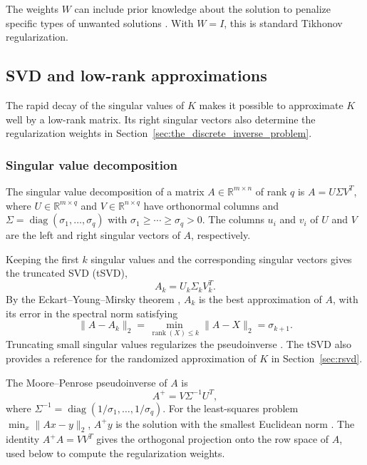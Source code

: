 The weights $W$ can include prior knowledge about the solution to penalize specific types of unwanted solutions \cite{hansen2010discrete}. With $W = I$, this is standard Tikhonov regularization.


\subsection{SVD and low-rank approximations}
The rapid decay of the singular values of $K$ makes it possible to approximate $K$ well by a low-rank matrix. Its right singular vectors also determine the regularization weights in Section~\ref{sec:the_discrete_inverse_problem}.

\subsubsection{Singular value decomposition}\label{sec:svd}
The singular value decomposition of a matrix $A\in\mathbb R^{m\times n}$ of rank $q$ is $A=U\Sigma V^T$, where $U\in\mathbb R^{m\times q}$ and $V\in\mathbb R^{n\times q}$ have orthonormal columns and $\Sigma=\operatorname{diag}(\sigma_1,\dots,\sigma_q)$ with $\sigma_1\ge\cdots\ge\sigma_q>0$. The columns $u_i$ and $v_i$ of $U$ and $V$ are the left and right singular vectors of $A$, respectively.

Keeping the first $k$ singular values and the corresponding singular vectors gives the truncated SVD (tSVD),
\begin{equation}\label{eq:tsvd}
    A_k = U_k\Sigma_k V_k^T.
\end{equation}
By the Eckart--Young--Mirsky theorem \cite{eckartApproximationOneMatrix1936}, $A_k$ is the best approximation of $A$, with its error in the spectral norm satisfying
\begin{equation}\label{eq:svd_error}
    \|A-A_k\|_2 = \min_{\operatorname{rank}(X)\le k}\|A-X\|_2 = \sigma_{k+1}.
\end{equation}
Truncating small singular values regularizes the pseudoinverse \cite{hansen2010discrete}. The tSVD also provides a reference for the randomized approximation of $K$ in Section~\ref{sec:rsvd}.


The Moore--Penrose pseudoinverse of $A$ is
\begin{equation}\label{eq:pseudoinverse}
    A^+ = V\Sigma^{-1}U^T,
\end{equation}
where $\Sigma^{-1}=\operatorname{diag}(1/\sigma_1,\dots,1/\sigma_q)$. For the least-squares problem $\min_x\|Ax-y\|_2$, $A^+y$ is the solution with the smallest Euclidean norm \cite[Section~5.5]{golubMatrixComputations4th2013}. The identity $A^+A=VV^T$ gives the orthogonal projection onto the row space of $A$, used below to compute the regularization weights.

